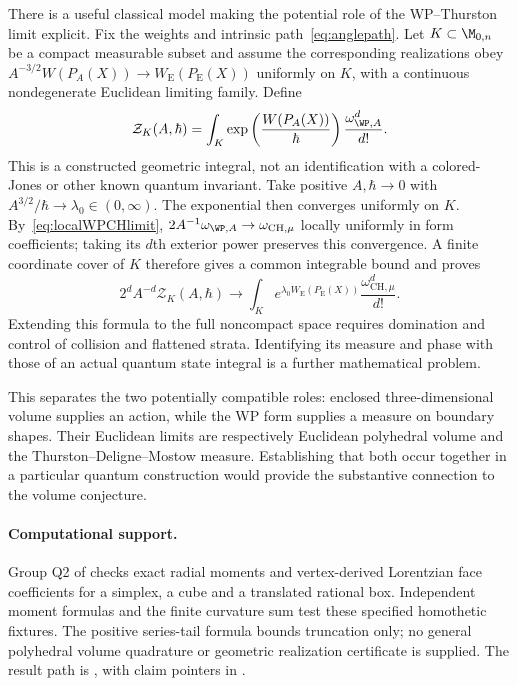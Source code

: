 There is a useful classical model making the potential role of
the WP--Thurston limit explicit. Fix the weights and intrinsic
path~\eqref{eq:anglepath}. Let $K\subset\M_{0,n}$ be a compact
measurable subset and assume the corresponding realizations obey
$A^{-3/2}W(P_A(X))\to W_{\mathrm E}(P_{\mathrm E}(X))$ uniformly
on $K$, with a continuous nondegenerate Euclidean limiting family.
Define
\begin{equation}
 \mathcal Z_K(A,\hbar)=\int_K
       \exp\left(\frac{W(P_A(X))}{\hbar}\right)
       \frac{\omega_{\WP,A}^d}{d!}.
 \label{eq:modelpartition}
\end{equation}
This is a constructed geometric integral, not an identification
with a colored-Jones or other known quantum invariant. Take positive $A,\hbar\to0$ with
$A^{3/2}/\hbar\to\lambda_0\in(0,\infty)$. The exponential
then converges uniformly on $K$. By~\eqref{eq:localWPCHlimit},
$2A^{-1}\omega_{\WP,A}\to\omega_{\mathrm{CH},\mu}$ locally
uniformly in form coefficients; taking its $d$th exterior power
preserves this convergence. A finite coordinate cover of $K$
therefore gives a common integrable bound and proves
\begin{equation}
 2^d A^{-d}\mathcal Z_K(A,\hbar)\longrightarrow
 \int_K e^{\lambda_0 W_{\mathrm E}(P_{\mathrm E}(X))}
                 \frac{\omega_{\mathrm{CH},\mu}^d}{d!}.
 \label{eq:modelpartitionlimit}
\end{equation}
Extending this formula to the full noncompact space requires
 domination and control of collision and flattened strata.
 Identifying its measure and phase with those of an actual quantum
 state integral is a further mathematical problem.

This separates the two potentially compatible roles: enclosed
three-dimensional volume supplies an action, while the WP form
supplies a measure on boundary shapes. Their Euclidean limits
are respectively Euclidean polyhedral volume and the
Thurston--Deligne--Mostow measure. Establishing that both occur
together in a particular quantum construction would provide the
substantive connection to the volume conjecture.

\paragraph{Computational support.}
Group Q2 of  checks
exact radial moments and vertex-derived Lorentzian face coefficients
for a simplex, a cube and a translated rational box. Independent
moment formulas and the finite curvature sum test these specified
homothetic fixtures. The positive series-tail formula bounds truncation
only; no general polyhedral volume quadrature or geometric realization
certificate is supplied. The result path is
, with claim pointers in
.
